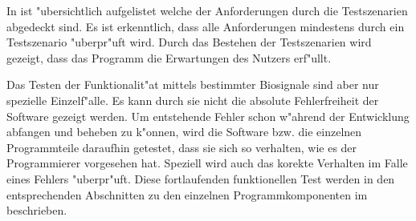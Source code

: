 In  ist "ubersichtlich aufgelistet welche der Anforderungen durch die Testszenarien abgedeckt sind.
Es ist erkenntlich, dass alle Anforderungen mindestens durch ein Testszenario "uberpr"uft wird.
Durch das Bestehen der Testszenarien wird gezeigt, dass das Programm die Erwartungen des Nutzers erf"ullt.

Das Testen der Funktionalit"at mittels bestimmter Biosignale sind aber nur spezielle Einzelf"alle.
Es kann durch sie nicht die absolute Fehlerfreiheit der Software gezeigt werden.
Um entstehende Fehler schon w"ahrend der Entwicklung abfangen und beheben zu k"onnen, wird die Software bzw. die einzelnen Programmteile daraufhin getestet, dass sie sich so verhalten, wie es der Programmierer vorgesehen hat.
Speziell wird auch das korekte Verhalten im Falle eines Fehlers "uberpr"uft.
Diese fortlaufenden funktionellen Test werden in den entsprechenden Abschnitten zu den einzelnen Programmkomponenten im  beschrieben.

